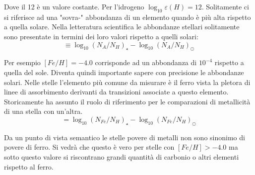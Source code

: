 \documentclass[12pt]{article}
\begin{document}
Dove il 12 è un valore costante. Per l’idrogeno $\log_{10}\varepsilon(H) =12$.
Solitamente ci si riferisce ad una "sovra-" abbondanza di un elemento quando è più alta rispetto a quella solare. 
Nella letteratura scientifica le abbondanze stellari solitamente sono presentate in termini dei loro valori rispetto a quelli solari:
\begin{equation}
[A/H] \equiv \log_{10}(N_A/N_H)_{\star} - \log_{10}(N_A/N_H)_{\odot}
\end{equation}

Per esempio $[Fe/H]=-4.0$ corrisponde ad un abbondanza di $10^{-4}$ rispetto a quella del sole. Diventa quindi importante sapere con precisione le abbondanze solari. Nelle stelle l’elemento più comune da misurare è il ferro vista la pletora di linee di assorbimento derivanti da transizioni associate a questo elemento. Storicamente ha assunto il ruolo di  riferimento per le comparazioni di metallicità di una stella con un'altra. 
\begin{equation}
[Fe/H] = \log_{10}(N_{Fe}/N_H)_{\star} - \log_{10}(N_{Fe}/N_H)_{\odot}
\end{equation}

 Da un punto di vista semantico le stelle povere di metalli non sono sinonimo di povere di ferro. Si vedrà che questo è vero per stelle con $[Fe/H]>-4.0$ ma sotto questo valore si riscontrano grandi quantità di carbonio o altri elementi rispetto al ferro. 
 
\end{document}
